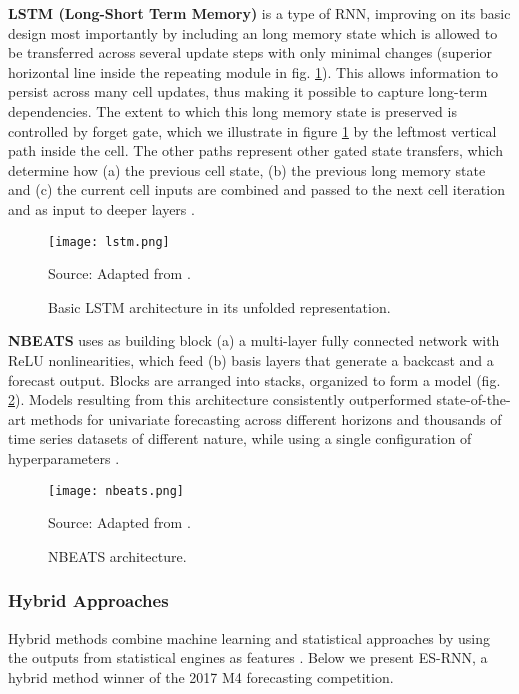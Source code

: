 \noindent
\textbf{LSTM (Long-Short Term Memory)} is a type of RNN, improving on its basic design most importantly by including an long memory state which is allowed to be transferred across several update steps with only minimal changes (superior horizontal line inside the repeating module in fig. \ref{fig:lstm}).
This allows information to persist across many cell updates, thus making it possible to capture long-term dependencies.
The extent to which this long memory state is preserved is controlled by forget gate, which we illustrate in figure \ref{fig:lstm} by the leftmost vertical path inside the cell.
The other paths represent other gated state transfers, which determine how (a) the previous cell state, (b) the previous long memory state and (c) the current cell inputs are combined and passed to the next cell iteration and as input to deeper layers \cite{paneru2015lstm}.
\begin{figure}[H]
	\centering
    \caption{Basic LSTM architecture in its unfolded representation. }
    \texttt{[image: lstm.png]}  \\
    \raggedright
    Source: Adapted from \cite{paneru2015lstm}.
	\label{fig:lstm}
\end{figure}

\noindent
\textbf{NBEATS} uses as building block (a) a multi-layer fully connected network with ReLU nonlinearities, which feed (b) basis layers that generate a backcast and a forecast output.
Blocks are arranged into stacks, organized to form a model (fig. \ref{fig:nbeats}).
Models resulting from this architecture consistently outperformed state-of-the-art methods for univariate forecasting across different horizons and thousands of time series datasets of different nature, while using a single configuration of hyperparameters \cite{oreshkin2019nbeats}.
\begin{figure}[H]
	\centering
    \caption{NBEATS architecture.}
    \texttt{[image: nbeats.png]}  \\
    \raggedright
    Source: Adapted from \cite{oreshkin2019nbeats}.
	\label{fig:nbeats}
\end{figure}

\subsubsection{Hybrid Approaches}
Hybrid methods combine machine learning and statistical approaches by using the outputs from statistical engines as features \cite{oreshkin2019nbeats}. Below we present ES-RNN, a hybrid method winner of the 2017 M4 forecasting competition.

